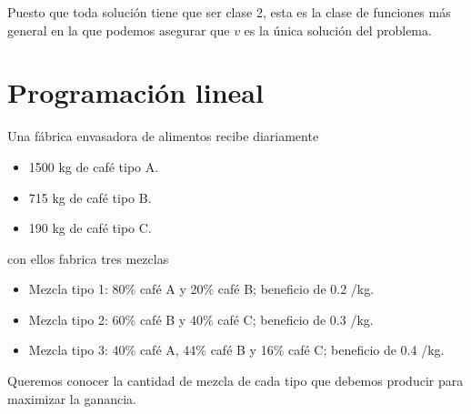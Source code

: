 \documentclass[a4]{article}
\begin{document}
Puesto que toda solución tiene que ser clase 2, esta es la clase de
funciones más general en la que podemos asegurar que $v$ es la única
solución del problema.

\newpage

\section{Programación lineal}

Una fábrica envasadora de alimentos recibe diariamente
\begin{itemize}
\item 1500 kg de café tipo A.
\item 715 kg de café tipo B.
\item 190 kg de café tipo C.
\end{itemize}
con ellos fabrica tres mezclas
\begin{itemize}
\item Mezcla tipo 1: 80\% café A y 20\% café B; beneficio de 0.2
  \EUR/kg.
\item Mezcla tipo 2: 60\% café B y 40\% café C; beneficio de 0.3
  \EUR/kg.
\item Mezcla tipo 3: 40\% café A, 44\% café B y 16\% café C; beneficio
  de 0.4 \EUR/kg.
\end{itemize}

Queremos conocer la cantidad de mezcla de cada tipo que debemos
producir para maximizar la ganancia.

\vspace{4mm}
\end{document}
